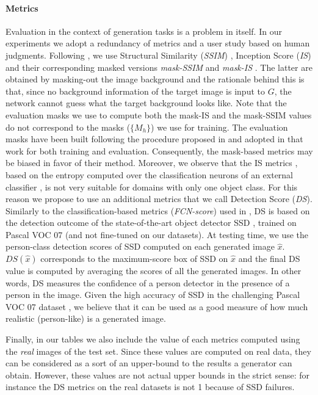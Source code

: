\documentclass[10pt,twocolumn,letterpaper]{article}
\begin{document}
\paragraph{Metrics}
Evaluation  in the context of generation tasks is a problem in itself. In our experiments 
 we adopt a redundancy of  metrics and a user study based on human judgments.
Following \cite{ma2017pose}, we use  Structural Similarity (\emph{SSIM}) \cite{wang2004image},  Inception Score (\emph{IS}) \cite{salimans2016improved} and their corresponding masked versions \emph{mask-SSIM} and \emph{mask-IS} \cite{ma2017pose}. The latter are obtained by masking-out the image background and the rationale behind this is that, since no background information of the target image is input to $G$, the network cannot guess what the target background looks like.  
Note that the evaluation masks we use to compute both the mask-IS and the mask-SSIM values do not correspond to the masks ($\{M_h\}$) we use for training. The evaluation masks have been built following the procedure proposed in \cite{ma2017pose} and adopted in that work for both  training and evaluation. Consequently, the mask-based metrics may be biased in favor of their method.
Moreover, we observe that
 the IS metrics  \cite{salimans2016improved}, based on the entropy computed over the classification neurons of an external classifier 
\cite{DBLP:journals/corr/SzegedyVISW15}, 
is not very suitable for
domains with only one object class. 
 For this reason we propose to  use an additional metrics that we call Detection Score (\emph{DS}). Similarly to the classification-based metrics ({\em FCN-score}) used in \cite{pix2pix2016}, DS is based on the detection outcome of
the state-of-the-art object detector SSD \cite{liu2016ssd},
trained on Pascal VOC 07 \cite{pascal-voc-2007} (and not fine-tuned on our datasets).
At testing time, we use the person-class detection scores of SSD 
computed on each generated image $\hat{x}$.
 $DS(\hat{x})$ corresponds to the maximum-score box of SSD on $\hat{x}$ and the final DS value is computed by averaging the scores of all the generated images. In other words, DS measures the confidence of a person detector in the presence of a person in the image. Given the high accuracy of SSD in the challenging Pascal VOC 07 dataset \cite{liu2016ssd}, we believe that it can be used as a good measure of how much realistic (person-like) is a generated image.


Finally, in our tables we also include  the value of each metrics computed using the {\em real} images of the test set. Since these  values are computed on real data, they can be considered as a sort of an upper-bound to the results a generator can obtain. However, these  values are not actual upper bounds in the strict sense: for instance the DS metrics on the real datasets is not 1 because of SSD failures. 
\end{document}

